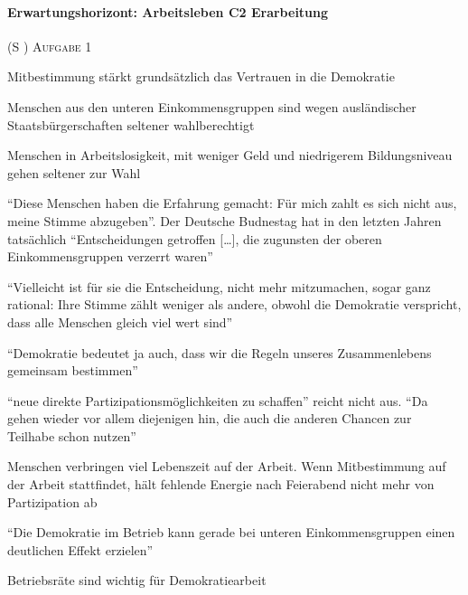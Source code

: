 \paragraph{Erwartungshorizont: Arbeitsleben C2 Erarbeitung} (\gls{S} \pageref{ARBEITSLEBEN-C2})
\textsc{Aufgabe 1} \quad 
\begin{myitemize}
    \item Mitbestimmung stärkt grundsätzlich das Vertrauen in die Demokratie
    \item Menschen aus den unteren Einkommensgruppen sind wegen ausländischer Staatsbürgerschaften seltener wahlberechtigt
    \item Menschen in Arbeitslosigkeit, mit weniger Geld und niedrigerem Bildungsniveau gehen seltener zur Wahl
    \item \enquote{Diese Menschen haben die Erfahrung gemacht: Für mich zahlt es sich nicht aus, meine Stimme abzugeben}. Der Deutsche Budnestag hat in den letzten Jahren tatsächlich \enquote{Entscheidungen getroffen [\dots], die zugunsten der oberen Einkommensgruppen verzerrt waren} \autocite{Elsasser.2017}
    \item \enquote{Vielleicht ist für sie die Entscheidung, nicht mehr mitzumachen, sogar ganz rational: Ihre Stimme zählt weniger als andere, obwohl die Demokratie verspricht, dass alle Menschen gleich viel wert sind}
    \item \enquote{Demokratie bedeutet ja auch, dass wir die Regeln unseres Zusammenlebens gemeinsam bestimmen}
    \item \enquote{neue direkte Partizipationsmöglichkeiten zu schaffen} reicht nicht aus. \enquote{Da gehen wieder vor allem diejenigen hin, die auch die anderen Chancen zur Teilhabe schon nutzen}
    \item Menschen verbringen viel Lebenszeit auf der Arbeit. Wenn Mitbestimmung auf der Arbeit stattfindet, hält fehlende Energie nach Feierabend nicht mehr von Partizipation ab
    \item \enquote{Die Demokratie im Betrieb kann gerade bei unteren Einkommensgruppen einen deutlichen Effekt erzielen}
    \item Betriebsräte sind wichtig für Demokratiearbeit
\end{myitemize}

